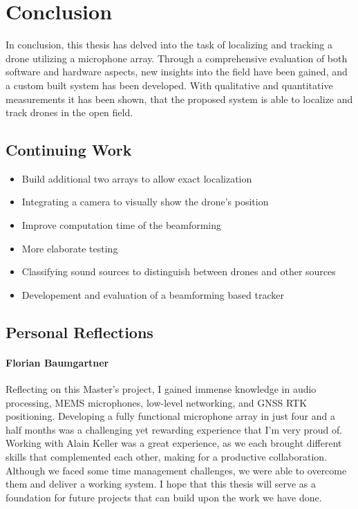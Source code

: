 \chapter{Conclusion}
In conclusion, this thesis has delved into the task of
localizing and tracking a drone utilizing a microphone array.
Through a comprehensive evaluation of both software and hardware aspects,
new insights into the field have been gained, and
a custom built system has been developed.
With qualitative and quantitative measurements it has been shown,
that the proposed system is able to localize and track
drones in the open field.

\section{Continuing Work}

\bigskip
\begin{itemize}
	\item Build additional two arrays to allow exact localization
	\item Integrating a camera to visually show the drone's position
	\item Improve computation time of the beamforming
	\item More elaborate testing
	\item Classifying sound sources to distinguish between drones and other sources
	\item Developement and evaluation of a beamforming based tracker
\end{itemize}
\newpage

\newpage
\section{Personal Reflections}
\subsubsection{Florian Baumgartner}
Reflecting on this Master's project, I gained immense knowledge in audio processing, MEMS microphones, low-level networking, and GNSS RTK positioning.
Developing a fully functional microphone array in just four and a half months was a challenging yet rewarding experience that I'm very proud of.
Working with Alain Keller was a great experience, as we each brought different skills that complemented each other, making for a productive collaboration.
Although we faced some time management challenges, we were able to overcome them and deliver a working system.
I hope that this thesis will serve as a foundation for future projects that can build upon the work we have done.

